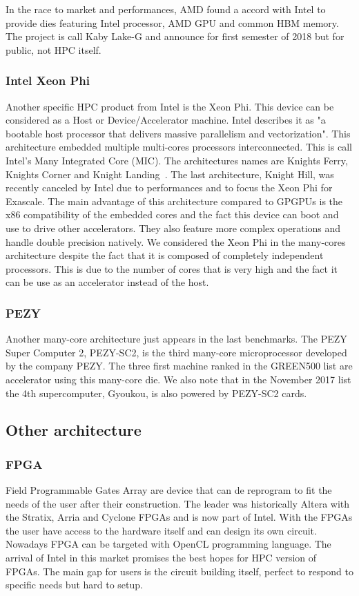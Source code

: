 In the race to market and performances, AMD found a accord with Intel to provide dies featuring Intel processor, AMD GPU and common HBM memory. 
The project is call  Kaby Lake-G and announce for first semester of 2018 but for public, not HPC itself. 

\subsubsection{Intel Xeon Phi}
Another specific HPC product from Intel is the Xeon Phi. 
This device can be considered as a Host or Device/Accelerator machine. 
Intel describes it as "a bootable host processor that delivers massive parallelism and vectorization".
This architecture embedded multiple multi-cores processors interconnected. 
This is call Intel's Many Integrated Core (MIC).
The architectures names are Knights Ferry, Knights Corner and Knight Landing~\cite{sodani2016knights}. 
The last architecture, Knight Hill, was recently canceled by Intel due to performances and to focus the Xeon Phi for Exascale.
The main advantage of this architecture compared to GPGPUs is the x86 compatibility of the embedded cores and the fact this device can boot and use to drive other accelerators. 
They also feature more complex operations and handle double precision natively.
We considered the Xeon Phi in the many-cores architecture despite the fact that it is composed of completely independent processors. 
This is due to the number of cores that is very high and the fact it can be use as an accelerator instead of the host.  


\subsubsection{PEZY}
Another many-core architecture just appears in the last benchmarks. 
The PEZY Super Computer 2, PEZY-SC2, is the third many-core microprocessor developed by the company PEZY. 
The three first machine ranked in the GREEN500 list are accelerator using this many-core die. 
We also note that in the November 2017 list the 4th supercomputer, Gyoukou, is also powered by PEZY-SC2 cards.

\subsection{Other architecture}
\subsubsection{FPGA}
Field Programmable Gates Array are device that can de reprogram to fit the needs of the user after their construction.
The leader was historically Altera with the Stratix, Arria and Cyclone FPGAs and is now part of Intel. 
With the FPGAs the user have access to the hardware itself and can design its own circuit. 
Nowadays FPGA can be targeted with OpenCL programming language. 
The arrival of Intel in this market promises the best hopes for HPC version of FPGAs. 
The main gap for users is the circuit building itself, perfect to respond to specific needs but hard to setup. 
